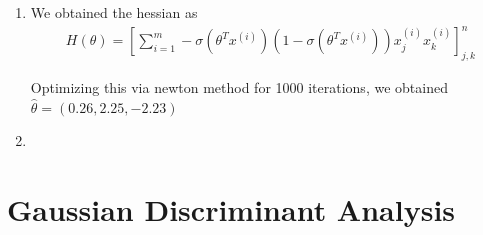 \documentclass[12pt]{article}
\begin{document}
\begin{enumerate}[label=(\alph*)]
    \item We obtained the hessian as 
    \begin{align*}
        H(\theta) = \left[ \sum_{i=1}^m -\sigma(\theta^T x^{(i)})(1-\sigma(\theta^T x^{(i)})) x_j^{(i)}x_k^{(i)} \right]_{j,k}^n
    \end{align*}

    Optimizing this via newton method for 1000 iterations, we obtained $\hat{\theta} = (0.26,2.25,-2.23)$

    \item \begin{center}\end{center}

\end{enumerate}

\pagebreak

\section*{Gaussian Discriminant Analysis}
\end{document}
